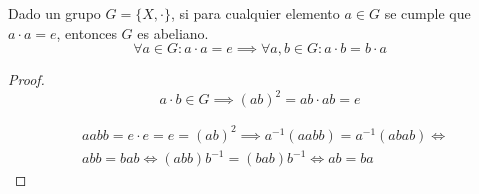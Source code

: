 \begin{thm}
    Dado un grupo $G = \{X, \cdot \}$, si para cualquier elemento $a \in G$ se cumple que $a \cdot a = e$, entonces $G$ es abeliano.
    \begin{equation}
        \forall a \in G : a\cdot a = e \implies \forall a,b \in G : a \cdot b = b \cdot a
    \end{equation}
\end{thm}

\begin{proof}
    \begin{equation}
        a \cdot b \in G \implies (ab)^2 = ab\cdot ab = e
    \end{equation}

    \begin{equation}
        \begin{split}
            & aabb = e \cdot e = e = (ab)^2 \implies a^{-1}(aabb) = a^{-1}(abab) \iff\\
            & abb = bab \iff (abb)b^{-1} = (bab)b^{-1} \iff ab = ba 
        \end{split}
    \end{equation}
\end{proof}

